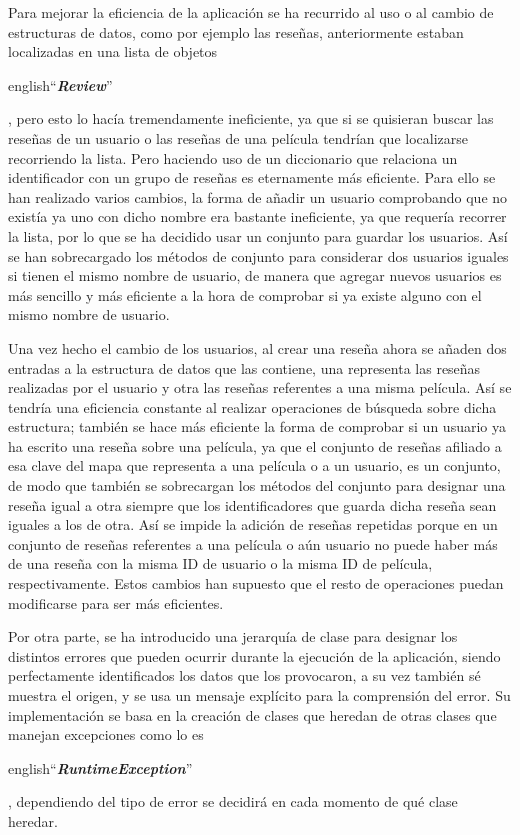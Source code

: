 Para mejorar la eficiencia de la aplicación se ha recurrido al uso o al cambio de estructuras de datos, como por 
ejemplo las reseñas, anteriormente estaban localizadas en una lista de objetos \begin{otherlanguage} {english}``\textit{\textbf{Review}}''\end{otherlanguage}, 
pero esto lo hacía tremendamente ineficiente, ya que si se quisieran buscar las reseñas de un usuario o las reseñas 
de una película tendrían que localizarse recorriendo la lista. Pero haciendo uso de un diccionario\cite{OaksJava} que 
relaciona un identificador con un grupo de reseñas es eternamente más eficiente. Para ello se han realizado varios 
cambios, la forma de añadir un usuario comprobando que no existía ya uno con dicho nombre era bastante ineficiente, ya 
que requería recorrer la lista, por lo que se ha decidido usar un conjunto para guardar los usuarios. Así se 
han sobrecargado los métodos de conjunto\cite{BlochEffective} para considerar dos usuarios iguales si tienen el mismo 
nombre de usuario, de manera que agregar nuevos usuarios es más sencillo y más eficiente a la hora de comprobar si ya 
existe alguno con el mismo nombre de usuario.

Una vez hecho el cambio de los usuarios, al crear una reseña ahora se añaden dos entradas a la estructura de datos 
que las contiene, una representa las reseñas realizadas por el usuario y otra las reseñas referentes a una misma 
película. Así se tendría una eficiencia constante al realizar operaciones de búsqueda sobre dicha 
estructura\cite{LaforeData}; también se hace más eficiente la forma de comprobar si un usuario ya ha escrito una 
reseña sobre una película, ya que el conjunto de reseñas afiliado a esa clave del mapa que representa a una película o 
a un usuario, es un conjunto, de modo que también se sobrecargan los métodos del conjunto para designar una reseña 
igual a otra siempre que los identificadores que guarda dicha reseña sean iguales a los de otra. Así se impide la 
adición de reseñas repetidas porque en un conjunto de reseñas referentes a una película o aún usuario no puede haber 
más de una reseña con la misma ID de usuario o la misma ID de película, respectivamente. Estos cambios han supuesto 
que el resto de operaciones puedan modificarse para ser más eficientes.

Por otra parte, se ha introducido una jerarquía de clase para designar los distintos errores que pueden ocurrir
durante la ejecución de la aplicación, siendo perfectamente identificados los datos que los provocaron, a su vez 
también sé muestra el origen, y se usa un mensaje explícito para la comprensión del error. Su implementación se 
basa en la creación de clases que heredan de otras clases que manejan excepciones como lo es \begin{otherlanguage} {english}``\textit{\textbf{RuntimeException}}''\end{otherlanguage}, 
dependiendo del tipo de error se decidirá en cada momento de qué clase heredar.

